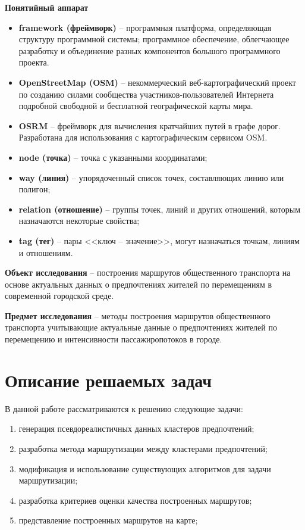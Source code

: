 \newpage

\textbf{Понятийный аппарат}
\vspace*{-1em}
\begin{itemize}\itemsep-5pt
    \item \textbf{framework (фреймворк)} -- программная платформа, определяющая структуру 
        программной системы; программное обеспечение, облегчающее разработку и объединение разных 
        компонентов большого программного проекта.
    \item \textbf{OpenStreetMap (OSM)} -- некоммерческий веб-картографический проект по созданию 
        силами сообщества участников-пользователей Интернета подробной свободной и бесплатной 
        географической карты мира.
    \item \textbf{OSRM} -- фреймворк для вычисления кратчайших путей в графе дорог. Разработана 
        для использования с картографическим сервисом OSM.
    \item \textbf{node (точка)} -- точка с указанными координатами;
    \item \textbf{way (линия)} -- упорядоченный список точек, составляющих линию или полигон;
    \item \textbf{relation (отношение)} -- группы точек, линий и других отношений, которым 
        назначаются некоторые свойства;
    \item \textbf{tag (тег)} -- пары <<ключ -- значение>>, могут назначаться точкам, линиям и 
        отношениям.
\end{itemize}

\textbf{Объект исследования} -- построения маршрутов общественного транспорта на основе актуальных 
данных о предпочтениях жителей по перемещениям в современной городской среде.

\textbf{Предмет исследования} -- методы построения маршрутов общественного транспорта учитывающие 
актуальные данные о предпочтениях жителей по перемещению и интенсивности пассажиропотоков в городе.

\chapter{Описание решаемых задач}
В данной работе рассматриваются к решению следующие задачи:
\begin{enumerate}\itemsep-5pt
    \item генерация псевдореалистичных данных кластеров предпочтений;
    \item разработка метода маршрутизации между кластерами предпочтений;
    \item модификация и использование существующих алгоритмов для задачи маршрутизации;
    \item разработка критериев оценки качества построенных маршрутов;
    \item представление построенных маршрутов на карте;
\end{enumerate}

